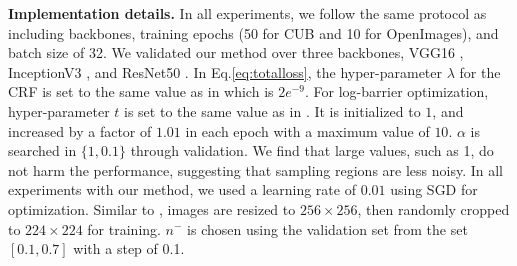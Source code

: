 \documentclass[twocolumn]{article}
\theoremstyle{definition}
\begin{document}
\noindent \textbf{Implementation details.} In all experiments, we follow the same protocol as  \cite{choe2020evaluating} including backbones, training epochs (50 for CUB and 10 for OpenImages), and batch size of 32. We validated our method over three backbones, VGG16 \cite{SimonyanZ14a}, InceptionV3 \cite{SzegedyVISW16}, and ResNet50 \cite{heZRS16}. In Eq.\ref{eq:totalloss}, the hyper-parameter $\lambda$ for the CRF is set to the same value as in \cite{tang2018regularized} which is ${2e^{-9}}$. For log-barrier optimization, hyper-parameter $t$ is set to the same value as in \cite{belharbi2019unimoconstraints,kervadec2019log}. It is initialized to $1$, and increased by a factor of ${1.01}$ in each epoch with a maximum value of $10$. $\alpha$ is searched in ${\{1, 0.1\}}$ through validation. We find that large values, such as 1, do not harm the performance, suggesting that sampling regions are less noisy. In all experiments with our method, we used a learning rate of $0.01$ using SGD for optimization. Similar to \cite{choe2020evaluating}, images are resized to ${256\times256}$, then randomly cropped to ${224\times224}$ for training. ${n^-}$ is chosen using the validation set from the set ${[0.1, 0.7]}$ with a step of 0.1.
\end{document}
